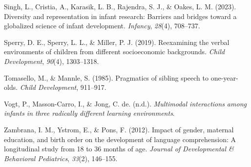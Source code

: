 \documentclass[
  man,floatsintext]{apa6}
\newlength{\cslhangindent}
\newlength{\cslentryspacingunit} %
\newenvironment{CSLReferences}[2] %
 {%
  \setlength{\parindent}{0pt}
  \ifodd #1
  \let\oldpar\par
  \def\par{\hangindent=\cslhangindent\oldpar}
  \fi
  \setlength{\parskip}{#2\cslentryspacingunit}
 }%
 {}
\begin{document}
\begin{CSLReferences}{1}{0}
\leavevmode{}%
Singh, L., Cristia, A., Karasik, L. B., Rajendra, S. J., \& Oakes, L. M. (2023). Diversity and representation in infant research: Barriers and bridges toward a globalized science of infant development. \emph{Infancy}, \emph{28}(4), 708--737.

\leavevmode{}%
Sperry, D. E., Sperry, L. L., \& Miller, P. J. (2019). Reexamining the verbal environments of children from different socioeconomic backgrounds. \emph{Child Development}, \emph{90}(4), 1303--1318.

\leavevmode{}%
Tomasello, M., \& Mannle, S. (1985). Pragmatics of sibling speech to one-year-olds. \emph{Child Development}, 911--917.

\leavevmode{}%
Vogt, P., Masson-Carro, I., \& Jong, C. de. (n.d.). \emph{Multimodal interactions among infants in three radically different learning environments}.

\leavevmode{}%
Zambrana, I. M., Ystrom, E., \& Pons, F. (2012). Impact of gender, maternal education, and birth order on the development of language comprehension: A longitudinal study from 18 to 36 months of age. \emph{Journal of Developmental \& Behavioral Pediatrics}, \emph{33}(2), 146--155.

\end{CSLReferences}
\end{document}
